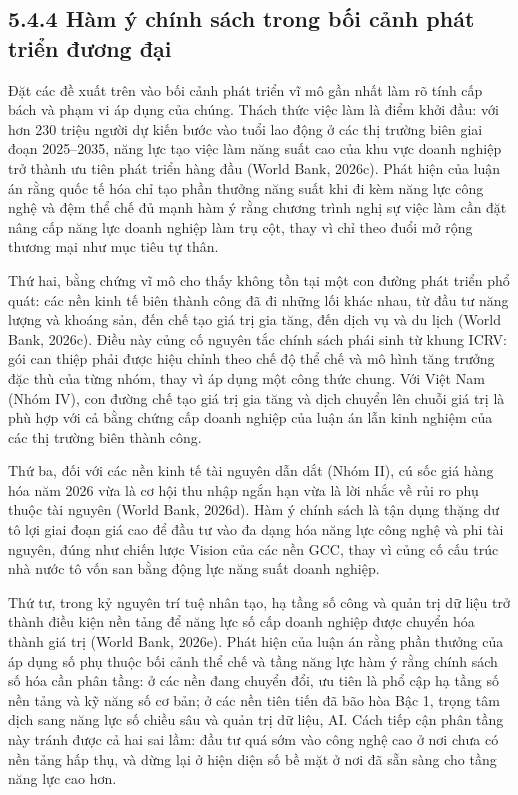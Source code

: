 \documentclass[
  a4paper,
  13pt]{extreport}
\begin{document}
\hypertarget{huxe0m-uxfd-chuxednh-suxe1ch-trong-bux1ed1i-cux1ea3nh-phuxe1t-triux1ec3n-ux111ux1b0ux1a1ng-ux111ux1ea1i}{%
\subsection{5.4.4 Hàm ý chính sách trong bối cảnh phát triển đương
đại}\label{huxe0m-uxfd-chuxednh-suxe1ch-trong-bux1ed1i-cux1ea3nh-phuxe1t-triux1ec3n-ux111ux1b0ux1a1ng-ux111ux1ea1i}}

Đặt các đề xuất trên vào bối cảnh phát triển vĩ mô gần nhất làm rõ tính
cấp bách và phạm vi áp dụng của chúng. Thách thức việc làm là điểm khởi
đầu: với hơn 230 triệu người dự kiến bước vào tuổi lao động ở các thị
trường biên giai đoạn 2025--2035, năng lực tạo việc làm năng suất cao
của khu vực doanh nghiệp trở thành ưu tiên phát triển hàng đầu (World
Bank, 2026c). Phát hiện của luận án rằng quốc tế hóa chỉ tạo phần thưởng
năng suất khi đi kèm năng lực công nghệ và đệm thể chế đủ mạnh hàm ý
rằng chương trình nghị sự việc làm cần đặt nâng cấp năng lực doanh
nghiệp làm trụ cột, thay vì chỉ theo đuổi mở rộng thương mại như mục
tiêu tự thân.

Thứ hai, bằng chứng vĩ mô cho thấy không tồn tại một con đường phát
triển phổ quát: các nền kinh tế biên thành công đã đi những lối khác
nhau, từ đầu tư năng lượng và khoáng sản, đến chế tạo giá trị gia tăng,
đến dịch vụ và du lịch (World Bank, 2026c). Điều này củng cố nguyên tắc
chính sách phái sinh từ khung ICRV: gói can thiệp phải được hiệu chỉnh
theo chế độ thể chế và mô hình tăng trưởng đặc thù của từng nhóm, thay
vì áp dụng một công thức chung. Với Việt Nam (Nhóm IV), con đường chế
tạo giá trị gia tăng và dịch chuyển lên chuỗi giá trị là phù hợp với cả
bằng chứng cấp doanh nghiệp của luận án lẫn kinh nghiệm của các thị
trường biên thành công.

Thứ ba, đối với các nền kinh tế tài nguyên dẫn dắt (Nhóm II), cú sốc giá
hàng hóa năm 2026 vừa là cơ hội thu nhập ngắn hạn vừa là lời nhắc về rủi
ro phụ thuộc tài nguyên (World Bank, 2026d). Hàm ý chính sách là tận
dụng thặng dư tô lợi giai đoạn giá cao để đầu tư vào đa dạng hóa năng
lực công nghệ và phi tài nguyên, đúng như chiến lược Vision của các nền
GCC, thay vì củng cố cấu trúc nhà nước tô vốn san bằng động lực năng
suất doanh nghiệp.

Thứ tư, trong kỷ nguyên trí tuệ nhân tạo, hạ tầng số công và quản trị dữ
liệu trở thành điều kiện nền tảng để năng lực số cấp doanh nghiệp được
chuyển hóa thành giá trị (World Bank, 2026e). Phát hiện của luận án rằng
phần thưởng của áp dụng số phụ thuộc bối cảnh thể chế và tầng năng lực
hàm ý rằng chính sách số hóa cần phân tầng: ở các nền đang chuyển đổi,
ưu tiên là phổ cập hạ tầng số nền tảng và kỹ năng số cơ bản; ở các nền
tiên tiến đã bão hòa Bậc 1, trọng tâm dịch sang năng lực số chiều sâu và
quản trị dữ liệu, AI. Cách tiếp cận phân tầng này tránh được cả hai sai
lầm: đầu tư quá sớm vào công nghệ cao ở nơi chưa có nền tảng hấp thụ, và
dừng lại ở hiện diện số bề mặt ở nơi đã sẵn sàng cho tầng năng lực cao
hơn.
\end{document}
